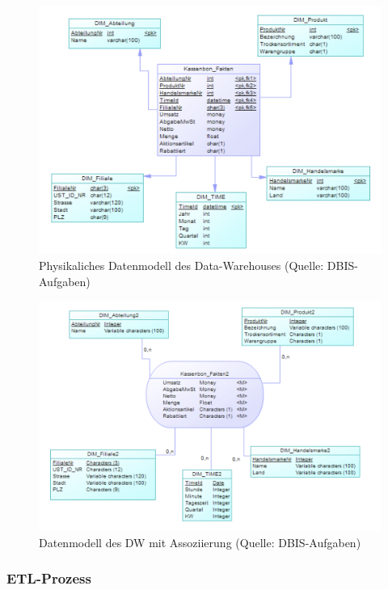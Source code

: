 \begin{figure}[ht!]
  \centering
  \includegraphics[width=1.1\linewidth]{pictures/DW_Physical_Data.png}
  \caption[Physikaliches Datenmodell des Data-Warehouses]{Physikaliches Datenmodell des Data-Warehouses (Quelle: DBIS-Aufgaben)}
  \label{dw_phys}
\end{figure}

\begin{figure}[ht!]
  \centering
  \includegraphics[width=1.1\linewidth]{pictures/dw_asso.png}
  \caption[Datenmodell des DW mit Assoziierung]{Datenmodell des DW mit Assoziierung (Quelle: DBIS-Aufgaben)}
  \label{dw_asso}
\end{figure}

\subsubsection{ETL-Prozess}

